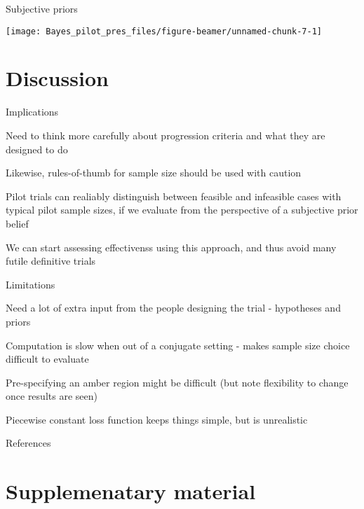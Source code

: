 \documentclass[
  ignorenonframetext,
]{beamer}
\begin{document}
\begin{frame}{Subjective priors}
\protect\hypertarget{subjective-priors}{}

\texttt{[image: Bayes\_pilot\_pres\_files/figure-beamer/unnamed-chunk-7-1]}

\end{frame}

\hypertarget{discussion}{%
\section{Discussion}\label{discussion}}

\begin{frame}{Implications}
\protect\hypertarget{implications}{}

Need to think more carefully about progression criteria and what they
are designed to do

Likewise, rules-of-thumb for sample size should be used with caution

Pilot trials can realiably distinguish between feasible and infeasible
cases with typical pilot sample sizes, if we evaluate from the
perspective of a subjective prior belief

We can start assessing effectivenss using this approach, and thus avoid
many futile definitive trials

\end{frame}

\begin{frame}{Limitations}
\protect\hypertarget{limitations}{}

Need a lot of extra input from the people designing the trial -
hypotheses and priors

Computation is slow when out of a conjugate setting - makes sample size
choice difficult to evaluate

Pre-specifying an amber region might be difficult (but note flexibility
to change once results are seen)

Piecewise constant loss function keeps things simple, but is unrealistic

\end{frame}

\begin{frame}{References}
\protect\hypertarget{references}{}

\end{frame}

\hypertarget{supplemenatary-material}{%
\section{Supplemenatary material}\label{supplemenatary-material}}
\end{document}
